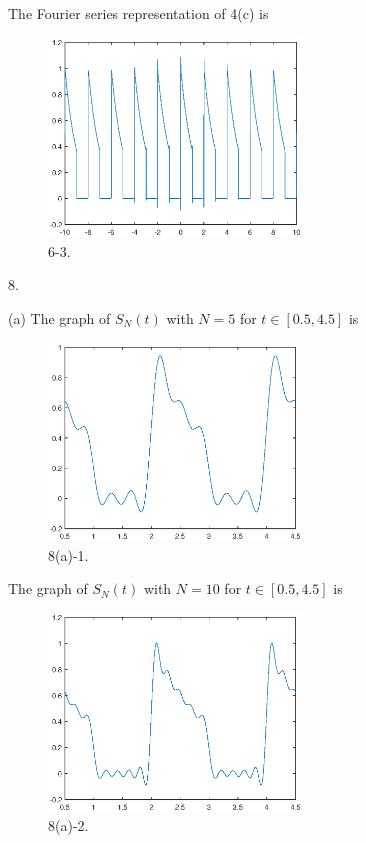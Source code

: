 \documentclass[a4paper]{article}
\begin{document}
The Fourier series representation of 4(c) is
\begin{figure}[H]
    \begin{center}
        \includegraphics[width=0.6\textwidth]{6-3.eps}
    \end{center}
    \caption{6-3.}
\end{figure}

8.

(a) The graph of $S_N(t)$ with $N=5$ for $t\in[0.5,4.5]$ is
\begin{figure}[H]
    \begin{center}
        \includegraphics[width=0.6\textwidth]{8(a)-1.eps}
    \end{center}
    \caption{8(a)-1.}
\end{figure}

The graph of $S_N(t)$ with $N=10$ for $t\in[0.5,4.5]$ is
\begin{figure}[H]
    \begin{center}
        \includegraphics[width=0.6\textwidth]{8(a)-2.eps}
    \end{center}
    \caption{8(a)-2.}
\end{figure}
\end{document}
